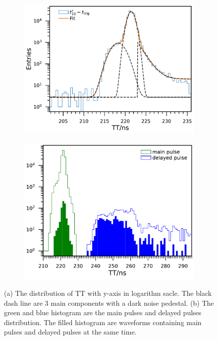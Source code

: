 \begin{figure}[!htbp]
    \centering
    \begin{subfigure}[t]{\SF\textwidth}
        \includegraphics[width=\textwidth]{figures/method/triggerTTSLog.pdf}
        \caption{}%
        \label{fig:triggerTTSLog}
    \end{subfigure}
    \begin{subfigure}[t]{\SF\textwidth}
        \includegraphics[width=\textwidth]{figures/method/triggerDelayedPulse.pdf}
        \caption{}%
        \label{fig:triggerTTlatepulse}
    \end{subfigure}
    \caption{(a) The distribution of TT with y-axis in logarithm sacle. The black dash line are 3 main components with a dark noise pedestal. (b) The green and blue histogram are the main pulses and delayed pulses distribution. The filled histogram are waveforms containing main pulses and delayed pulses at the same time.}
\end{figure}

